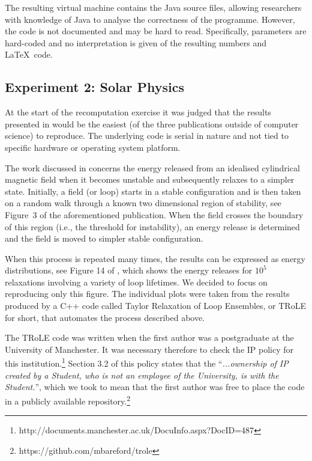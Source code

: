 The resulting virtual machine contains the Java source files, allowing researchers with knowledge of Java to analyse the correctness of the programme. However, the code is not documented and may be hard to read. Specifically, parameters are hard-coded and no interpretation is given of the resulting numbers and \LaTeX\ code.

\subsection*{Experiment 2: Solar Physics}

At the start of the recomputation exercise it was judged that the results presented in \cite{bareford2010nanoflare} would be the easiest (of the three publications outside of computer science) to reproduce. The underlying code is serial in nature and not tied to specific hardware or operating system platform. 

The work discussed in \cite{bareford2010nanoflare} concerns the energy released from an idealised cylindrical magnetic field when it becomes unstable and subsequently relaxes to a simpler state. Initially, a field (or loop) starts in a stable configuration and is then taken on a random walk through a known two dimensional region of stability, see \mbox{Figure 3} of the aforementioned publication. When the field crosses the boundary of this region (i.e., the threshold for instability), an energy release is determined and the field is moved to simpler stable configuration. 

When this process is repeated many times, the results can be expressed as energy distributions, see Figure 14 of \cite{bareford2010nanoflare}, which shows the energy releases for $10^5$ relaxations involving a variety of loop lifetimes. We decided to focus on reproducing only this figure. The individual plots were taken from the results produced by a C++ code called Taylor Relaxation of Loop Ensembles, or TRoLE for short, that automates the process described above.

The TRoLE code was written when the first author \cite{bareford2010nanoflare} was a postgraduate at the University of Manchester. It was necessary therefore to check the IP policy for this institution.\footnote{http://documents.manchester.ac.uk/DocuInfo.aspx?DocID=487} Section 3.2 of this policy states that the ``\emph{...ownership of IP created by a Student, who is not an employee of the University, is with the Student.}'', which we took to mean that the first author was free to place the code in a publicly available repository.\footnote{https://github.com/mbareford/trole}

